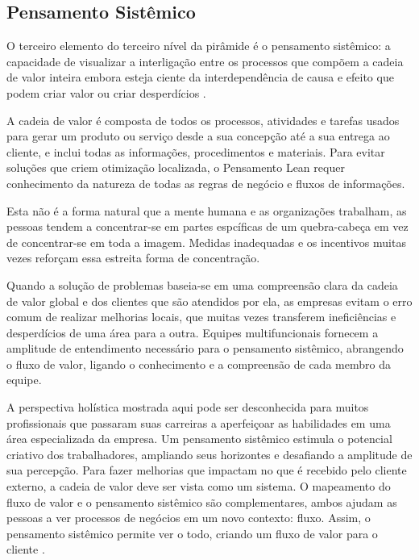 \begin{anexosenv}
\subsection[Pensamento Sistêmico]{Pensamento Sistêmico}

O terceiro elemento do terceiro nível da pirâmide é o pensamento sistêmico: a capacidade de visualizar a interligação entre os processos que compõem a cadeia de valor inteira embora esteja ciente da interdependência de causa e efeito que podem criar valor ou criar desperdícios \cite{bell2011}.

A cadeia de valor é composta de todos os processos, atividades e tarefas usados para gerar um produto ou serviço desde a sua concepção até a sua entrega ao cliente, e inclui todas as informações, procedimentos e materiais. Para evitar soluções que criem otimização localizada, o Pensamento Lean requer conhecimento da natureza de todas as regras de negócio e fluxos de informações.   

Esta não é a forma natural que a mente humana e as organizações trabalham, as pessoas tendem a concentrar-se em partes espcíficas de um quebra-cabeça em vez de concentrar-se em toda a imagem. Medidas inadequadas e os incentivos muitas vezes reforçam essa estreita forma de concentração.

Quando a solução de problemas baseia-se em uma compreensão clara da cadeia de valor global e dos clientes que são atendidos por ela, as empresas evitam o erro comum de realizar melhorias locais, que muitas vezes transferem ineficiências e desperdícios de uma área para a outra. Equipes multifuncionais fornecem a amplitude de entendimento necessário para o pensamento sistêmico, abrangendo o fluxo de valor, ligando o conhecimento e a compreensão de cada membro da equipe.

A perspectiva holística mostrada aqui pode ser desconhecida para muitos profissionais que passaram suas carreiras a aperfeiçoar as habilidades em uma área especializada da empresa. Um pensamento sistêmico estimula o potencial criativo dos trabalhadores, ampliando seus horizontes e desafiando a amplitude de sua percepção. Para fazer melhorias que impactam no que é recebido pelo cliente externo, a cadeia de valor deve ser vista como um sistema. O mapeamento do fluxo de valor e o pensamento sistêmico são complementares, ambos ajudam as pessoas a ver processos de negócios em um novo contexto: fluxo. Assim, o pensamento sistêmico permite ver o todo, criando um fluxo de valor para o cliente \cite{bell2011}.


\end{anexosenv}
